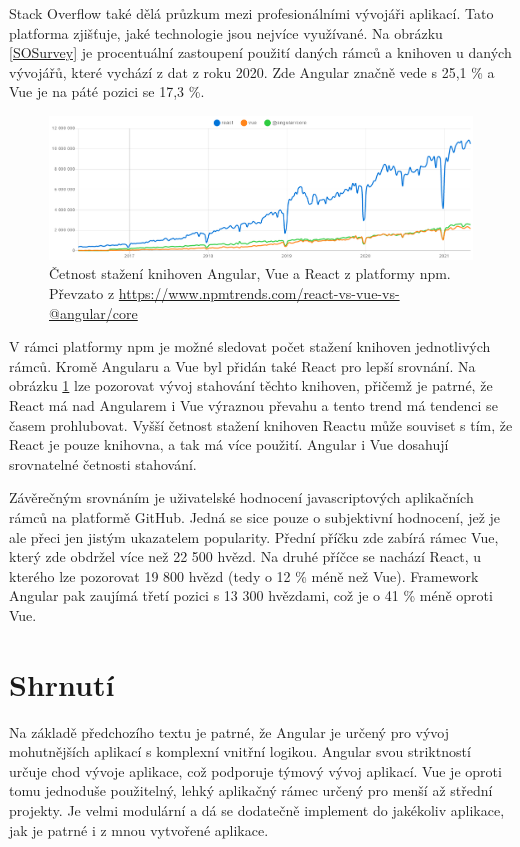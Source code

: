 Stack Overflow také dělá průzkum mezi profesionálními vývojáři aplikací. Tato platforma zjišťuje, jaké technologie jsou nejvíce využívané. Na obrázku \ref{SOSurvey} je procentuální zastoupení použití daných rámců a knihoven u daných vývojářů, které vychází z dat z roku 2020. Zde Angular značně vede s 25,1 \% a Vue je na páté pozici se 17,3 \%.

\FloatBarrier
\begin{figure}[!htb]
\label{NpmDownloads}
\centering
\includegraphics[width=\textwidth]{obrazky-figures/frameworkPopularityByDownloads.png}
\caption{Četnost stažení knihoven Angular, Vue a React z platformy npm. Převzato z \url{https://www.npmtrends.com/react-vs-vue-vs-@angular/core}}
\end{figure}
\FloatBarrier

V rámci platformy npm je možné sledovat počet stažení knihoven jednotlivých rámců. Kromě Angularu a Vue byl přidán také React pro lepší srovnání. Na obrázku \ref{NpmDownloads} lze pozorovat vývoj stahování těchto knihoven, přičemž je patrné, že React má nad Angularem i Vue výraznou převahu a tento trend má tendenci se časem prohlubovat. Vyšší četnost stažení knihoven Reactu může souviset s tím, že React je pouze knihovna, a tak má více použití. Angular i Vue dosahují srovnatelné četnosti stahování.

Závěrečným srovnáním je uživatelské hodnocení javascriptových aplikačních rámců na platformě GitHub. Jedná se sice pouze o subjektivní hodnocení, jež je ale přeci jen jistým ukazatelem popularity. Přední příčku zde zabírá rámec Vue, který zde obdržel více než 22 500 hvězd\cite{risingstars}. Na druhé příčce se nachází React, u kterého lze pozorovat 19 800 hvězd (tedy o 12 \% méně než Vue). Framework Angular pak zaujímá třetí pozici s 13 300 hvězdami, což je o 41 \% méně oproti Vue.


    \section{Shrnutí}
Na základě předchozího textu je patrné, že Angular je určený pro vývoj mohutnějších aplikací s komplexní vnitřní logikou. Angular svou striktností určuje chod vývoje aplikace, což podporuje týmový vývoj aplikací. Vue je oproti tomu jednoduše použitelný, lehký aplikačný rámec určený pro menší až střední projekty. Je velmi modulární a dá se dodatečně implement do jakékoliv aplikace, jak je patrné i z mnou vytvořené aplikace.